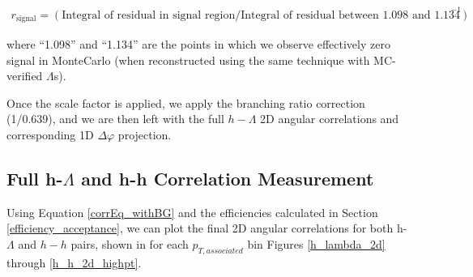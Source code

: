 \documentclass[ALICE,manyauthors]{ALICE_analysis_notes}
\begin{document}
\begin{align}
	r_{\text{signal}} = (\text{Integral of residual in signal region} / \text{Integral of residual between 1.098 and 1.134})^{-1}
\end{align}

where ``1.098'' and ``1.134'' are the points in which we observe effectively zero signal in MonteCarlo (when reconstructed using the same technique with MC-verified $\Lambda$s). 

Once the scale factor is applied, we apply the branching ratio correction (1/0.639), and we are then left with the full $h-\Lambda$ 2D angular correlations and corresponding 1D $\Delta\varphi$ projection.

\subsection{Full h-$\Lambda$ and h-h Correlation Measurement}

Using Equation \ref{corrEq_withBG} and the efficiencies calculated in Section \ref{efficiency_acceptance}, we can plot the final 2D angular correlations for both h-$\Lambda$ and $h-h$ pairs, shown in for each $p_{T, associated}$ bin Figures \ref{h_lambda_2d} through \ref{h_h_2d_highpt}.
\end{document}
